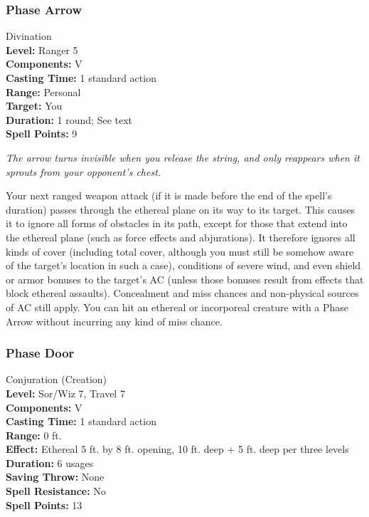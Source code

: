 \subsubsection{Phase Arrow}
\label{Spell:PhaseArrow}
Divination
\\ \textbf{Level:} Ranger 5
\\ \textbf{Components:} V
\\ \textbf{Casting Time:} 1 standard action
\\ \textbf{Range:} Personal
\\ \textbf{Target:} You
\\ \textbf{Duration:} 1 round; See text
\\ \textbf{Spell Points:} 9

\emph{The arrow turns invisible when you release the string, and only reappears when it sprouts from your opponent's chest.}

Your next ranged weapon attack (if it is made before the end of the spell's duration) passes through the ethereal plane on its way to its target.
This causes it to ignore all forms of obstacles in its path, except for those that extend into the ethereal plane (such as force effects and abjurations).
It therefore ignores all kinds of cover (including total cover, although you must still be somehow aware of the target's location in such a case), conditions of severe wind, and even shield or armor bonuses to the target's AC (unless those bonuses result from effects that block ethereal assaults).
Concealment and miss chances and non-physical sources of AC still apply.
You can hit an ethereal or incorporeal creature with a Phase Arrow without incurring any kind of miss chance.
\subsubsection{Phase Door}
\label{Spell:PhaseDoor}
Conjuration (Creation)
\\ \textbf{Level:} Sor/Wiz 7, Travel 7
\\ \textbf{Components:} V
\\ \textbf{Casting Time:} 1 standard action
\\ \textbf{Range:} 0 ft.
\\ \textbf{Effect:} Ethereal 5 ft. by 8 ft. opening, 10 ft. deep + 5 ft. deep per three levels
\\ \textbf{Duration:} 6 usages
\\ \textbf{Saving Throw:} None
\\ \textbf{Spell Resistance:} No
\\ \textbf{Spell Points:} 13

